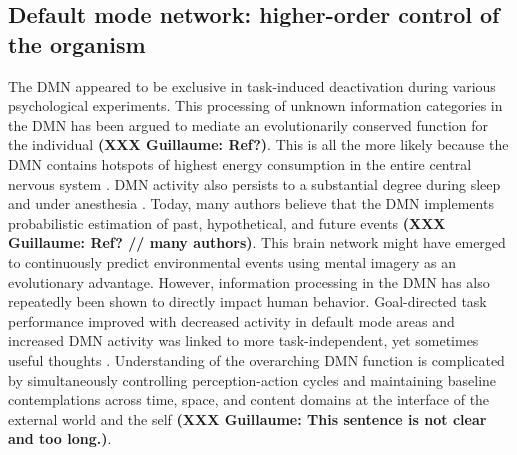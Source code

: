 \documentclass[10pt,letterpaper]{article}
\begin{document}
\subsection{Default mode network: higher-order control of the organism}
The DMN appeared to be exclusive in task-induced
deactivation during various psychological experiments.
This processing of unknown information categories in the DMN has
been argued to mediate an evolutionarily conserved function for the individual \textbf{(XXX Guillaume: Ref?)}.
This is all the more likely because the DMN contains hotspots
of highest energy consumption in the entire central nervous system
\citep{raichle2001pnas}.
DMN activity also persists to a substantial degree during
sleep and under anesthesia \citep{randy2008}.
Today, many authors believe that the DMN implements
probabilistic estimation of past, hypothetical, and future events \textbf{(XXX Guillaume: Ref? // many authors)}. This
brain network
might have emerged to continuously predict environmental events using
mental imagery as an evolutionary advantage.
%
However, information processing in the DMN has also repeatedly
been shown to directly impact human behavior. Goal-directed task performance
improved with decreased activity in default mode areas \citep{weiss2006}
and increased DMN activity was linked to more task-independent,
yet sometimes useful thoughts
\citep{mason2007, seli2016mind}.
%
Understanding of the overarching DMN function is complicated by
simultaneously controlling perception-action cycles and
maintaining baseline contemplations
across time, space, and content domains
at the interface of the external world and the self \textbf{(XXX Guillaume: This sentence is not clear and too long.)}.
\end{document}
